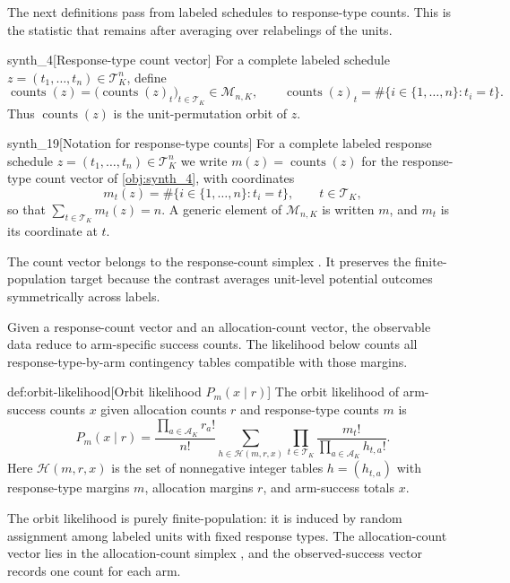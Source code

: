 \documentclass[11pt]{article}
\begin{document}
The next definitions pass from labeled schedules to response-type counts. This is the statistic that remains after averaging over relabelings of the units.

\begin{definitionv}{synth_4}[Response-type count vector]
For a complete labeled schedule \(z=(t_1,\ldots,t_n)\in\mathcal T_K^n\), define
\[
\operatorname{counts}(z)=\bigl(\operatorname{counts}(z)_t\bigr)_{t\in\mathcal T_K}\in\mathcal M_{n,K},
\qquad
\operatorname{counts}(z)_t=\#\{i\in\{1,\ldots,n\}:t_i=t\}.
\]
Thus \(\operatorname{counts}(z)\) is the unit-permutation orbit of \(z\).
\end{definitionv}

\begin{definitionv}{synth_19}[Notation for response-type counts]
For a complete labeled response schedule \(z=(t_1,\ldots,t_n)\in\mathcal T_K^n\) we write \(m(z)=\operatorname{counts}(z)\) for the response-type count vector of \cref{obj:synth_4}, with coordinates
\[
m_t(z)=\#\{i\in\{1,\ldots,n\}:t_i=t\},\qquad t\in\mathcal T_K,
\]
so that \(\sum_{t\in\mathcal T_K}m_t(z)=n\). A generic element of \(\mathcal M_{n,K}\) is written \(m\), and \(m_t\) is its coordinate at \(t\).
\end{definitionv}

The count vector  belongs to the response-count simplex . It preserves the finite-population target because the contrast averages unit-level potential outcomes symmetrically across labels.

Given a response-count vector and an allocation-count vector, the observable data reduce to arm-specific success counts. The likelihood below counts all response-type-by-arm contingency tables compatible with those margins.

\begin{definitionv}{def:orbit-likelihood}[Orbit likelihood $P_m(x\mid r)$]
The orbit likelihood of arm-success counts \(x\) given allocation counts \(r\) and response-type counts \(m\) is
\[
P_m(x\mid r)=\frac{\prod_{a\in\mathcal A_K}r_a!}{n!}\sum_{h\in\mathcal H(m,r,x)}\prod_{t\in\mathcal T_K}\frac{m_t!}{\prod_{a\in\mathcal A_K}h_{t,a}!}.
\]
Here \(\mathcal H(m,r,x)\) is the set of nonnegative integer tables \(h=(h_{t,a})\) with response-type margins \(m\), allocation margins \(r\), and arm-success totals \(x\).
\end{definitionv}

The orbit likelihood  is purely finite-population: it is induced by random assignment among labeled units with fixed response types. The allocation-count vector  lies in the allocation-count simplex , and the observed-success vector  records one count for each arm.
\end{document}
